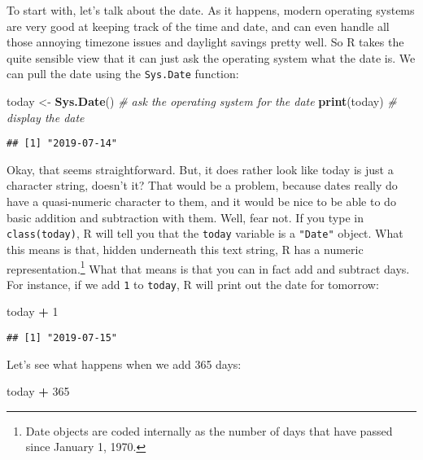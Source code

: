 \documentclass[]{book}
\newenvironment{Shaded}{\begin{snugshade}}{\end{snugshade}}
\newcommand{\CommentTok}[1]{\textcolor[rgb]{0.56,0.35,0.01}{\textit{#1}}}
\newcommand{\DecValTok}[1]{\textcolor[rgb]{0.00,0.00,0.81}{#1}}
\newcommand{\KeywordTok}[1]{\textcolor[rgb]{0.13,0.29,0.53}{\textbf{#1}}}
\newcommand{\NormalTok}[1]{#1}
\newcommand{\OperatorTok}[1]{\textcolor[rgb]{0.81,0.36,0.00}{\textbf{#1}}}
\newcommand{\StringTok}[1]{\textcolor[rgb]{0.31,0.60,0.02}{#1}}
\let\rmarkdownfootnote\footnote%
\def\footnote{\protect\rmarkdownfootnote}
\begin{document}
To start with, let's talk about the date. As it happens, modern operating systems are very good at keeping track of the time and date, and can even handle all those annoying timezone issues and daylight savings pretty well. So R takes the quite sensible view that it can just ask the operating system what the date is. We can pull the date using the \texttt{Sys.Date} function:

\begin{Shaded}
\begin{Highlighting}[]
\NormalTok{today <-}\StringTok{ }\KeywordTok{Sys.Date}\NormalTok{()  }\CommentTok{# ask the operating system for the date}
\KeywordTok{print}\NormalTok{(today)         }\CommentTok{# display the date}
\end{Highlighting}
\end{Shaded}

\begin{verbatim}
## [1] "2019-07-14"
\end{verbatim}

Okay, that seems straightforward. But, it does rather look like today is just a character string, doesn't it? That would be a problem, because dates really do have a quasi-numeric character to them, and it would be nice to be able to do basic addition and subtraction with them. Well, fear not. If you type in \texttt{class(today)}, R will tell you that the \texttt{today} variable is a \texttt{"Date"} object. What this means is that, hidden underneath this text string, R has a numeric representation.\footnote{Date objects are coded internally as the number of days that have passed since January 1, 1970.} What that means is that you can in fact add and subtract days. For instance, if we add \texttt{1} to \texttt{today}, R will print out the date for tomorrow:

\begin{Shaded}
\begin{Highlighting}[]
\NormalTok{today }\OperatorTok{+}\StringTok{ }\DecValTok{1}
\end{Highlighting}
\end{Shaded}

\begin{verbatim}
## [1] "2019-07-15"
\end{verbatim}

Let's see what happens when we add 365 days:

\begin{Shaded}
\begin{Highlighting}[]
\NormalTok{today }\OperatorTok{+}\StringTok{ }\DecValTok{365}
\end{Highlighting}
\end{Shaded}
\end{document}
